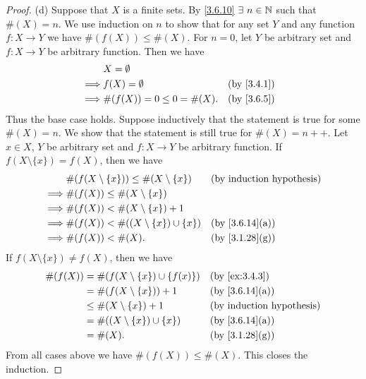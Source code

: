 \begin{proof}{(d)}
  Suppose that \(X\) is a finite sets.
  By \cref{3.6.10} \(\exists\ n \in \N\) such that \(\#(X) = n\).
  We use induction on \(n\) to show that for any set \(Y\) and any function \(f : X \to Y\) we have \(\#(f(X)) \leq \#(X)\).
  For \(n = 0\), let \(Y\) be arbitrary set and \(f : X \to Y\) be arbitrary function.
  Then we have
  \begin{align*}
             & X = \emptyset                                              \\
    \implies & f(X) = \emptyset             &  & \text{(by \cref{3.4.1})} \\
    \implies & \#(f(X)) = 0 \leq 0 = \#(X). &  & \text{(by \cref{3.6.5})}
  \end{align*}
  Thus the base case holds.
  Suppose inductively that the statement is true for some \(\#(X) = n\).
  We show that the statement is still true for \(\#(X) = n++\).
  Let \(x \in X\), \(Y\) be arbitrary set and \(f : X \to Y\) be arbitrary function.
  If \(f(X \setminus \{x\}) = f(X)\), then we have
  \begin{align*}
             & \#(f(X \setminus \{x\})) \leq \#(X \setminus \{x\}) &  & \text{(by induction hypothesis)} \\
    \implies & \#(f(X)) \leq \#(X \setminus \{x\})                                                       \\
    \implies & \#(f(X)) < \#(X \setminus \{x\}) + 1                                                      \\
    \implies & \#(f(X)) < \#((X \setminus \{x\}) \cup \{x\})       &  & \text{(by \cref{3.6.14}(a))}     \\
    \implies & \#(f(X)) < \#(X).                                   &  & \text{(by \cref{3.1.28}(g))}
  \end{align*}
  If \(f(X \setminus \{x\}) \neq f(X)\), then we have
  \begin{align*}
    \#(f(X)) & = \#(f(X \setminus \{x\}) \cup \{f(x)\}) &  & \text{(by \cref{ex:3.4.3})}      \\
             & = \#(f(X \setminus \{x\})) + 1           &  & \text{(by \cref{3.6.14}(a))}     \\
             & \leq \#(X \setminus \{x\}) + 1           &  & \text{(by induction hypothesis)} \\
             & = \#((X \setminus \{x\}) \cup \{x\})     &  & \text{(by \cref{3.6.14}(a))}     \\
             & = \#(X).                                 &  & \text{(by \cref{3.1.28}(g))}
  \end{align*}
  From all cases above we have \(\#(f(X)) \leq \#(X)\).
  This closes the induction.


\end{proof}
